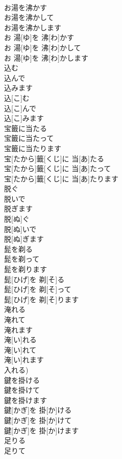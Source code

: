 \documentclass[8pt]{extreport}
\begin{document}
\begin{CJK}{UTF8}{min}
\\	お湯を沸かす 
\\	お湯を沸かして 
\\	お湯を沸かします	
\\	お 湯[ゆ]を 沸[わ]かす 
\\	お 湯[ゆ]を 沸[わ]かして 
\\	お 湯[ゆ]を 沸[わ]かします	
\\	込む 
\\	込んで 
\\	込みます	
\\	込[こ]む 
\\	込[こ]んで 
\\	込[こ]みます	
\\	宝籤に当たる 
\\	宝籤に当たって 
\\	宝籤に当たります	
\\	宝[たから]籤[くじ]に 当[あ]たる 
\\	宝[たから]籤[くじ]に 当[あ]たって 
\\	宝[たから]籤[くじ]に 当[あ]たります	
\\	脱ぐ 
\\	脱いで 
\\	脱ぎます	
\\	脱[ぬ]ぐ 
\\	脱[ぬ]いで 
\\	脱[ぬ]ぎます	
\\	髭を剃る 
\\	髭を剃って 
\\	髭を剃ります	
\\	髭[ひげ]を 剃[そ]る 
\\	髭[ひげ]を 剃[そ]って 
\\	髭[ひげ]を 剃[そ]ります	
\\	淹れる 
\\	淹れて 
\\	淹れます	
\\	淹[い]れる 
\\	淹[い]れて 
\\	淹[い]れます 
\\	入れる)	
\\	鍵を掛ける 
\\	鍵を掛けて 
\\	鍵を掛けます	
\\	鍵[かぎ]を 掛[か]ける 
\\	鍵[かぎ]を 掛[か]けて 
\\	鍵[かぎ]を 掛[か]けます	
\\	足りる 
\\	足りて 

\end{CJK}
\end{document}
